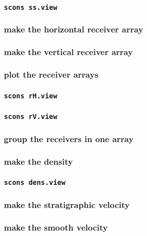 \begin{frame} \frametitle{\texttt{scons ss.view}}
\end{frame}

\begin{frame} \frametitle{make the horizontal receiver array}
\end{frame}
\cwpnote{}

\begin{frame} \frametitle{make the vertical receiver array}
\end{frame}
\cwpnote{}

\begin{frame} \frametitle{plot the receiver arrays}
\end{frame}
\cwpnote{}

\begin{frame} \frametitle{\texttt{scons rH.view}}
\end{frame}
\begin{frame} \frametitle{\texttt{scons rV.view}}
\end{frame}

\begin{frame} \frametitle{group the receivers in one array}
\end{frame}
\cwpnote{}

\begin{frame} \frametitle{make the density}
\end{frame}
\cwpnote{}

\begin{frame} \frametitle{\texttt{scons dens.view}}
\end{frame}

\begin{frame} \frametitle{make the stratigraphic velocity}
\end{frame}
\cwpnote{}

\begin{frame} \frametitle{make the smooth velocity}
\end{frame}
\cwpnote{}

